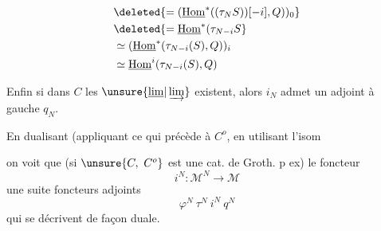 \[
\begin{aligned}
&\deleted{=(\underline{\operatorname{Hom}}^*((\tau_NS))[-i],Q))_0}\\
&\deleted{=\underline{\operatorname{Hom}}^*(\tau_{N-i}S}\\
&\simeq(\underline{\operatorname{Hom}}^*(\tau_{N-i}(S),Q))_i\\
&\simeq\underline{\operatorname{Hom}}^i(\tau_{N-i}(S),Q)
\end{aligned}
\]

Enfin si dans $C$ les $\unsure{\underline{\lim}|\varinjlim}$ existent, alors $i_N$ admet un adjoint à gauche $q_N$.

En dualisant (appliquant ce qui précède à $C^o$, en utilisant l'isom


on voit que (si $\unsure{C,\ C^o}$ est une cat. de Groth. p ex) le foncteur
\[ i^N:\mathcal M^N\longrightarrow\mathcal M \]
  une suite   foncteurs adjoints
\[ \varphi^N\ \tau^N\ i^N\ q^N \]
qui se décrivent de façon duale.

